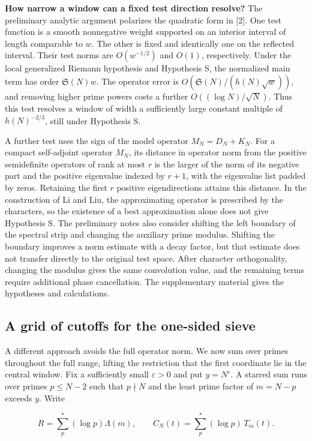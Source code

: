 \documentclass[11pt,a4paper]{article}
\begin{document}
\textbf{How narrow a window can a fixed test direction resolve?} The preliminary analytic argument polarizes the quadratic form in [2]. One test function is a smooth nonnegative weight supported on an interior interval of length comparable to $w$. The other is fixed and identically one on the reflected interval. Their test norms are $O(w^{-1/2})$ and $O(1)$, respectively. Under the local generalized Riemann hypothesis and Hypothesis S, the normalized main term has order $\mathfrak S(N)w$. The operator error is $O(\mathfrak S(N)/(h(N)\sqrt w))$, and removing higher prime powers costs a further $O((\log N)/\sqrt N)$. Thus this test resolves a window of width a sufficiently large constant multiple of $h(N)^{-2/3}$, still under Hypothesis S.

A further test uses the sign of the model operator $M_N=D_N+K_N$. For a compact self-adjoint operator $M_N$, its distance in operator norm from the positive semidefinite operators of rank at most $r$ is the larger of the norm of its negative part and the positive eigenvalue indexed by $r+1$, with the eigenvalue list padded by zeros. Retaining the first $r$ positive eigendirections attains this distance. In the construction of Li and Liu, the approximating operator is prescribed by the characters, so the existence of a best approximation alone does not give Hypothesis S. The preliminary notes also consider shifting the left boundary of the spectral strip and changing the auxiliary prime modulus. Shifting the boundary improves a norm estimate with a decay factor, but that estimate does not transfer directly to the original test space. After character orthogonality, changing the modulus gives the same convolution value, and the remaining terms require additional phase cancellation. The supplementary material gives the hypotheses and calculations.

\subsection{A grid of cutoffs for the one-sided sieve}

A different approach avoids the full operator norm. We now sum over primes throughout the full range, lifting the restriction that the first coordinate lie in the central window. Fix a sufficiently small $\varepsilon>0$ and put $y=N^\varepsilon$. A starred sum runs over primes $p\le N-2$ such that $p\nmid N$ and the least prime factor of $m=N-p$ exceeds $y$. Write

\[
R=\sum_p^*(\log p)\Lambda(m),\qquad C_N(t)=\sum_p^*(\log p)\,T_m(t).
\]
\end{document}
